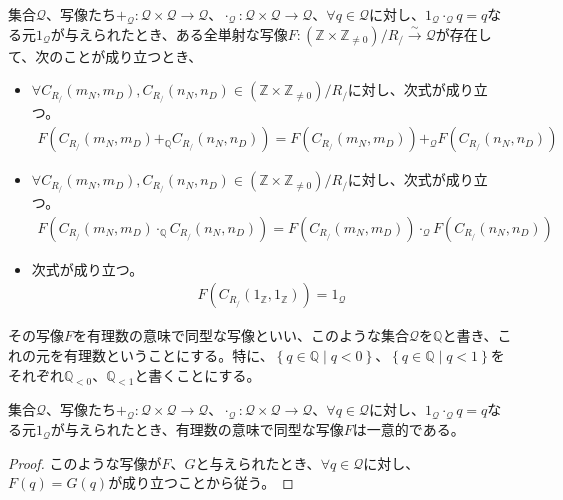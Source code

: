 \documentclass[dvipdfmx]{jsarticle}
\begin{document}
\begin{dfn}
集合$\mathcal{Q}$、写像たち$+_{\mathcal{Q}}\mathcal{:Q \times Q \rightarrow Q}$、$\cdot_{\mathcal{Q}}\mathcal{:Q \times Q \rightarrow Q}$、$\forall q \in \mathcal{Q}$に対し、$1_{\mathcal{Q}} \cdot_{\mathcal{Q}}q = q$なる元$1_{\mathcal{Q}}$が与えられたとき、ある全単射な写像$F:\left( \mathbb{Z} \times \mathbb{Z}_{\neq 0} \right) /R_{/} \overset{\sim}{\rightarrow}\mathcal{Q}$が存在して、次のことが成り立つとき、
\begin{itemize}
\item
  $\forall C_{R_{/}}\left( m_{N},m_{D} \right),C_{R_{/}}\left( n_{N},n_{D} \right) \in \left( \mathbb{Z} \times \mathbb{Z}_{\neq 0} \right) /R_{/} $に対し、次式が成り立つ。
\begin{align*}
F\left( C_{R_{/}}\left( m_{N},m_{D} \right) +_{\mathbb{Q}}C_{R_{/}}\left( n_{N},n_{D} \right) \right) = F\left( C_{R_{/}}\left( m_{N},m_{D} \right) \right) +_{\mathcal{Q}}F\left( C_{R_{/}}\left( n_{N},n_{D} \right) \right)
\end{align*}
\item
  $\forall C_{R_{/}}\left( m_{N},m_{D} \right),C_{R_{/}}\left( n_{N},n_{D} \right) \in \left( \mathbb{Z} \times \mathbb{Z}_{\neq 0} \right) /R_{/} $に対し、次式が成り立つ。
\begin{align*}
F\left( C_{R_{/}}\left( m_{N},m_{D} \right) \cdot_{\mathbb{Q}}C_{R_{/}}\left( n_{N},n_{D} \right) \right) = F\left( C_{R_{/}}\left( m_{N},m_{D} \right) \right) \cdot_{\mathcal{Q}}F\left( C_{R_{/}}\left( n_{N},n_{D} \right) \right)
\end{align*}
\item
  次式が成り立つ。
\begin{align*}
F\left( C_{R_{/}}\left( 1_{\mathbb{Z}},1_{\mathbb{Z}} \right) \right) = 1_{\mathcal{Q}}
\end{align*}
\end{itemize}
その写像$F$を有理数の意味で同型な写像といい、このような集合$\mathcal{Q}$を$\mathbb{Q}$と書き、これの元を有理数ということにする。特に、$\left\{ q \in \mathbb{Q} \middle| q < 0 \right\}$、$\left\{ q \in \mathbb{Q} \middle| q < 1 \right\}$をそれぞれ$\mathbb{Q}_{< 0}$、$\mathbb{Q}_{< 1}$と書くことにする。
\end{dfn}
\begin{thm}\label{1.2.6.19}
集合$\mathcal{Q}$、写像たち$+_{\mathcal{Q}}\mathcal{:Q \times Q \rightarrow Q}$、$\cdot_{\mathcal{Q}}\mathcal{:Q \times Q \rightarrow Q}$、$\forall q \in \mathcal{Q}$に対し、$1_{\mathcal{Q}} \cdot_{\mathcal{Q}}q = q$なる元$1_{\mathcal{Q}}$が与えられたとき、有理数の意味で同型な写像$F$は一意的である。
\end{thm}
\begin{proof}
このような写像が$F$、$G$と与えられたとき、$\forall q \in \mathcal{Q}$に対し、$F(q) = G(q)$が成り立つことから従う。
\end{proof}
\end{document}
